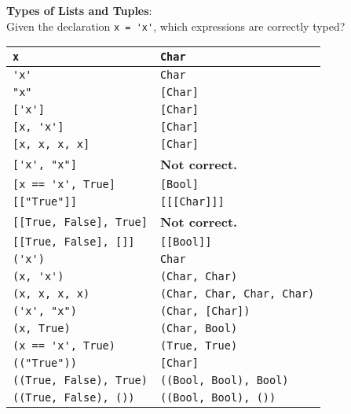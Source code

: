 \textbf{Types of Lists and Tuples}:\\
Given the declaration \lstinline|x = 'x'|, which expressions are correctly typed?\\
\begin{tabularx}{\linewidth}{|X|X|}
  \hline
  \lstinline|x| & \lstinline|Char|\\
  \hline
  \lstinline|'x'| & \lstinline|Char|\\
  \hline
  \lstinline|"x"| & \lstinline|[Char]|\\
  \hline
  \lstinline|['x']| & \lstinline|[Char]|\\
  \hline
  \lstinline|[x, 'x']| & \lstinline|[Char]|\\
  \hline
  \lstinline|[x, x, x, x]| & \lstinline|[Char]|\\
  \hline
  \lstinline|['x', "x"]| & \textbf{Not correct.}\\
  \hline
  \lstinline|[x == 'x', True]| & \lstinline|[Bool]|\\
  \hline
  \lstinline|[["True"]]| & \lstinline|[[[Char]]]|\\
  \hline
  \lstinline|[[True, False], True]| & \textbf{Not correct.}\\
  \hline
  \lstinline|[[True, False], []]| & \lstinline|[[Bool]]|\\
  \hline
  \lstinline|('x')| & \lstinline|Char|\\
  \hline
  \lstinline|(x, 'x')| & \lstinline|(Char, Char)|\\
  \hline
  \lstinline|(x, x, x, x)| & \lstinline|(Char, Char, Char, Char)|\\
  \hline
  \lstinline|('x', "x")| & \lstinline|(Char, [Char])|\\
  \hline
  \lstinline|(x, True)| & \lstinline|(Char, Bool)|\\
  \hline
  \lstinline|(x == 'x', True)| & \lstinline|(True, True)|\\
  \hline
  \lstinline|(("True"))| & \lstinline|[Char]|\\
  \hline
  \lstinline|((True, False), True)| & \lstinline|((Bool, Bool), Bool)|\\
  \hline
  \lstinline|((True, False), ())| & \lstinline|((Bool, Bool), ())|\\
  \hline
\end{tabularx}

